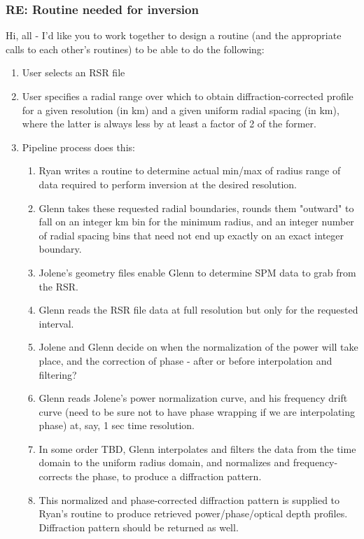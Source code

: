 \documentclass[crop=false,class=article,oneside]{standalone}
\begin{document}
\subsubsection{\footnotesize RE: Routine needed for inversion}
Hi, all - I'd like you to work together to design a routine (and the appropriate calls to each other's routines) to be able to do the following:
\begin{enumerate}
    \item User selects an RSR file
    \item User specifies a radial range over which to obtain diffraction-corrected profile for a given resolution (in km) and a given uniform radial spacing (in km), where the latter is always less by at least a factor of 2 of the former.
    \item Pipeline process does this:
    \begin{enumerate}
        \item Ryan writes a routine to determine actual min/max of radius range of data required to perform inversion at the desired resolution.
        \item Glenn takes these requested radial boundaries, rounds them "outward" to fall on an integer km bin for the minimum radius, and an integer number of radial spacing bins that need not end up exactly on an exact integer boundary.
        \item Jolene's geometry files enable Glenn to determine SPM data to grab from the RSR.
        \item Glenn reads the RSR file data at full resolution but only for the requested interval.
        \item Jolene and Glenn decide on when the normalization of the power will take place, and the correction of phase - after or before interpolation and filtering?
        \item Glenn reads Jolene's power normalization curve, and his frequency drift curve (need to be sure not to have phase wrapping if we are interpolating phase) at, say, 1 sec time resolution.
        \item In some order TBD, Glenn interpolates and filters the data from the time domain to the uniform radius domain, and normalizes and frequency-corrects the phase, to produce a diffraction pattern.
        \item This normalized and phase-corrected diffraction pattern is supplied to Ryan's routine to produce retrieved power/phase/optical depth profiles. Diffraction pattern should be returned as well.
    \end{enumerate}
\end{enumerate}
\end{document}
